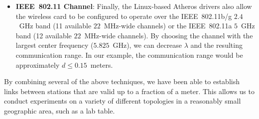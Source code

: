 \documentclass{article}
\newenvironment{myitemize}{
	\begin{itemize}
	\setlength{\itemsep}{1pt}
	\setlength{\parskip}{0pt}
	\setlength{\parsep}{0pt}}{\end{itemize}
	}
\begin{document}
\begin{myitemize}
\item \textbf{IEEE~802.11 Channel}:
  Finally, the Linux-based Atheros drivers also allow the wireless card to be configured to operate over the IEEE~802.11b/g \(2.4\)~GHz band (11 available \(22\)~MHz-wide channels) or the IEEE~802.11a \(5\)~GHz band (12 available \(22\)~MHz-wide channels).
  By choosing the channel with the largest center frequency (\(5.825\)~GHz), we can decrease \(\lambda\) and the resulting communication range.
  In our example, the communication range would be approximately \(d \leq 0.15\)~meters.

\end{myitemize}


By combining several of the above techniques, we have been able to establish links between stations that are valid up to a fraction of a meter.
This allows us to conduct experiments on a variety of different topologies in a reasonably small geographic area, such as a lab table.
\end{document}
